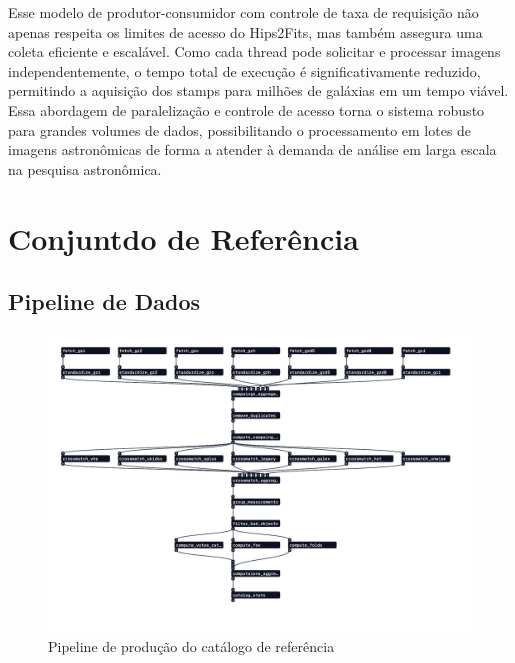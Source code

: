 Esse modelo de produtor-consumidor com controle de taxa de requisição não apenas respeita os limites de acesso do Hips2Fits, mas também assegura uma coleta eficiente e escalável. Como cada thread pode solicitar e processar imagens independentemente, o tempo total de execução é significativamente reduzido, permitindo a aquisição dos stamps para milhões de galáxias em um tempo viável. Essa abordagem de paralelização e controle de acesso torna o sistema robusto para grandes volumes de dados, possibilitando o processamento em lotes de imagens astronômicas de forma a atender à demanda de análise em larga escala na pesquisa astronômica.












\section{Conjuntdo de Referência}
\label{sec:dados-referencia}



\subsection{Pipeline de Dados}
\label{sec:dados-pipeline}

\lipsum[1-2]

\begin{figure}[h!]
  \centering
  \caption{Pipeline de produção do catálogo de referência}
  \label{fig:pipeline-ref}
  \includegraphics[width=\linewidth,trim={8mm 20mm 15mm 8mm},clip]{figures/pipe.pdf}
\end{figure}




